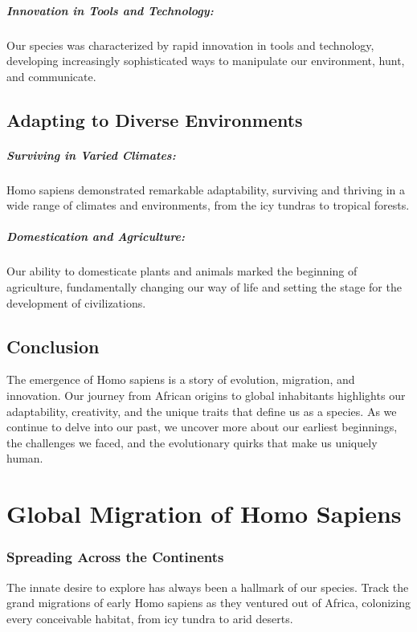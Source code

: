 \documentclass{book}
\begin{document}
\paragraph{Innovation in Tools and Technology:}
Our species was characterized by rapid innovation in tools and technology, developing increasingly sophisticated ways to manipulate our environment, hunt, and communicate.

\section*{Adapting to Diverse Environments}

\paragraph{Surviving in Varied Climates:}
Homo sapiens demonstrated remarkable adaptability, surviving and thriving in a wide range of climates and environments, from the icy tundras to tropical forests.

\paragraph{Domestication and Agriculture:}
Our ability to domesticate plants and animals marked the beginning of agriculture, fundamentally changing our way of life and setting the stage for the development of civilizations.

\section*{Conclusion}

The emergence of Homo sapiens is a story of evolution, migration, and innovation. Our journey from African origins to global inhabitants highlights our adaptability, creativity, and the unique traits that define us as a species. As we continue to delve into our past, we uncover more about our earliest beginnings, the challenges we faced, and the evolutionary quirks that make us uniquely human.

\chapter{Global Migration of Homo Sapiens}
\subsection*{Spreading Across the Continents}
The innate desire to explore has always been a hallmark of our species. Track the grand migrations of early Homo sapiens as they ventured out of Africa, colonizing every conceivable habitat, from icy tundra to arid deserts.
\end{document}
